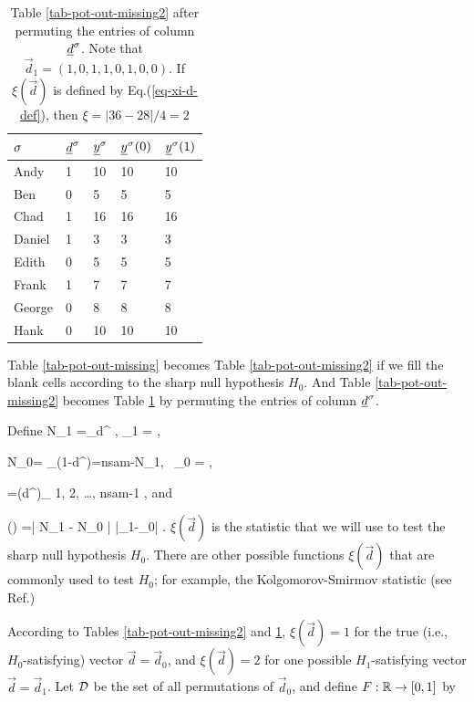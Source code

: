 \begin{table}[h!]
\centering
\begin{tabular}{|l|l|l|l|l|}
\hline
\rowcolor[HTML]{ECF4FF} 
$\sigma$ & ${\underline{d}}^\sigma$ & ${\underline{y}}^\sigma$ & ${\underline{y}}^\sigma(0)$ & ${\underline{y}}^\sigma(1)$ \\ \hline
Andy & \cellcolor[HTML]{FFFFC7}1 & 10 & 10 & 10 \\ \hline
Ben & 0 & 5 & 5 & 5 \\ \hline
Chad & \cellcolor[HTML]{FFFFC7}1 & 16 & 16 & 16 \\ \hline
Daniel & \cellcolor[HTML]{FFFFC7}1 & 3 & 3 & 3 \\ \hline
Edith & 0 & 5 & 5 & 5 \\ \hline
Frank & \cellcolor[HTML]{FFFFC7}1 & 7 & 7 & 7 \\ \hline
George & 0 & 8 & 8 & 8 \\ \hline
Hank & 0 & 10 & 10 & 10 \\ \hline
\end{tabular}
\caption{Table \ref{tab-pot-out-missing2}
after permuting the entries of column ${\underline{d}}^\sigma$.
Note that
$\vec{d}_1=(1,0,1,1,0,1,0,0)$.
If  $\xi(\vec{d})$
is defined by Eq.(\ref{eq-xi-d-def}), then
$\xi=|36-28|/4=2$}
\label{tab-pot-out-missing3}
\end{table}

Table \ref{tab-pot-out-missing} becomes
Table \ref{tab-pot-out-missing2}
if we fill the blank cells
according to the
sharp null hypothesis $H_0$.
And Table \ref{tab-pot-out-missing2}
becomes  Table \ref{tab-pot-out-missing3}
by permuting
the entries of column ${\underline{d}}^\sigma$.

Define
\beq
N_1 =\sum_\s d^\s
,\;\;\; \pi_1 = 
\;,
\eeq

\beq
N_0= \sum_\s (1-d^\s)=nsam-N_1,
\;\;\
\pi_0 = 
\;,
\eeq

 
\beq
{}=(d^\s)_{ 1, 2, \ldots, nsam-1}
\;,
\eeq
and


\beq
\xi() =\left|
{N_1}
-
{N_0}
\right|
\rarrow |\caly_1-\caly_0|
\label{eq-xi-d-def}
\;.
\eeq
$\xi(\vec{d})$
is the statistic
that we will use to 
test the sharp null hypothesis $H_0$.
There are other
possible functions $\xi(\vec{d})$
that are commonly used 
to test $H_0$; for example,
the Kolgomorov-Smirmov statistic 
(see Ref.\cite{book-mixtape})

According
to Tables
\ref{tab-pot-out-missing2}
and
\ref{tab-pot-out-missing3}, 
$\xi(\vec{d})=1$
for the true (i.e., $H_0$-satisfying) 
 vector $\vec{d}=\vec{d}_0$,
and $\xi(\vec{d})=2$ for
one possible
$H_1$-satisfying vector  
$\vec{d}=\vec{d}_1$.
Let ${\cal D}$ be the
set of all permutations of $\vec{d}_0$,
and define $F:{ \mathbb{R}}\rightarrow [0,1]$ by


